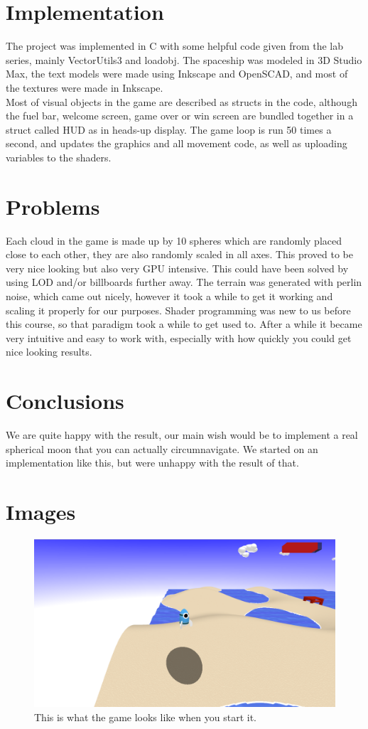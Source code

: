 \documentclass[11pt]{article}
\begin{document}
\section{Implementation}
The project was implemented in C with some helpful code given from the lab series, mainly VectorUtils3 and loadobj.
The spaceship was modeled in 3D Studio Max, the text models were made using Inkscape and OpenSCAD, and most of the textures were made in Inkscape.\\

Most of visual objects in the game are described as structs in the code, although the fuel bar, welcome screen, game over or win screen are bundled together in a struct called HUD as in heads-up display.
The game loop is run 50 times a second, and updates the graphics and all movement code, as well as uploading variables to the shaders.
\section{Problems}
Each cloud in the game is made up by 10 spheres which are randomly placed close to each other, they are also randomly scaled in all axes. This proved to be very nice looking but also very GPU intensive. This could have been solved by using LOD and/or billboards further away.
The terrain was generated with perlin noise, which came out nicely, however it took a while to get it working and scaling it properly for our purposes. 
Shader programming was new to us before this course, so that paradigm took a while to get used to. After a while it became very intuitive and easy to work with, especially with how quickly you could get nice looking results.
\section{Conclusions}
We are quite happy with the result, our main wish would be to implement a real spherical moon that you can actually circumnavigate. We started on an implementation like this, but were unhappy with the result of that.

\section{Images}
\begin{figure}[h!]
\centering
\includegraphics[width=\textwidth]{screenshots/ingame_2.png}
\caption{This is what the game looks like when you start it.}
\end{figure}
\end{document}
